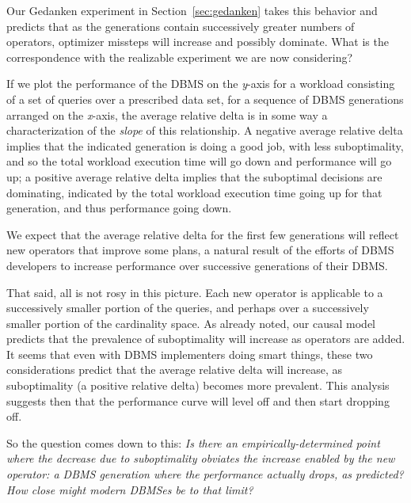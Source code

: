 \documentclass[prodmode,acmtods]{acmsmall}
\begin{document}
Our Gedanken experiment in
Section~\ref{sec:gedanken} takes this behavior and predicts that
as the generations contain successively greater numbers of
operators, optimizer missteps will increase and possibly dominate. What is
the correspondence with the realizable experiment we are now considering?

If we plot the performance of the DBMS on the {\em y}-axis for a
workload consisting of a set of queries over a 
prescribed data set, for a sequence of DBMS generations arranged on the
{\em x}-axis, the average relative delta is in some way a characterization
of the {\em slope} of this relationship. A negative average relative delta
implies that the indicated generation is doing a good job, with less
suboptimality, and so the total workload execution time will go down and
performance will go up; a
positive average relative delta implies that the suboptimal decisions are
dominating, indicated by the total workload execution time going up for that
generation, and thus performance going down.

We expect that the average relative delta for the first few
generations will reflect new operators that improve some
plans, a natural result of the \hbox{efforts} of \hbox{DBMS} developers to
increase performance over successive generations of their \hbox{DBMS}.

That said, all is not rosy in this picture. Each new operator is applicable
to a successively smaller portion of the queries, and perhaps over a
successively smaller portion of the cardinality space.  As already noted,
our causal model predicts that the prevalence of suboptimality will
increase as operators are added.  It seems that even
with DBMS implementers doing smart things, these two considerations predict
that the average relative delta 
will  increase, as suboptimality (a positive relative delta) becomes
more prevalent. This analysis suggests then that the performance curve will
level off and then start dropping off.

So the question comes down to this:  {\em Is there an empirically-determined
point where the decrease due to suboptimality obviates the increase enabled
by the new operator: a DBMS generation where the performance actually drops,
as predicted? How close might modern \hbox{DBMSes} be to that limit?}
\end{document}
